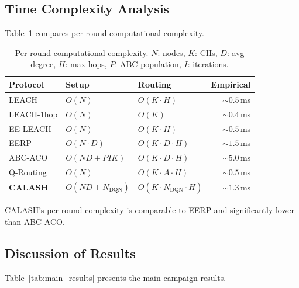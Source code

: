 \documentclass[12pt, onecolumn, journal]{IEEEtran}
\begin{document}
\subsection{Time Complexity Analysis}
\label{sec:complexity}

Table~\ref{tab:complexity} compares per-round computational complexity.

\begin{table}[!t]
\centering
\caption{Per-round computational complexity. $N$: nodes, $K$: CHs, $D$: avg degree, $H$: max hops, $P$: ABC population, $I$: iterations.}
\label{tab:complexity}
\begin{tabular}{lllr}
\toprule
Protocol & Setup & Routing & Empirical \\
\midrule
LEACH~\cite{heinzelman2000leach}       & $O(N)$             & $O(K \cdot H)$       & ${\sim}0.5$\,ms \\
LEACH-1hop                              & $O(N)$             & $O(K)$               & ${\sim}0.4$\,ms \\
EE-LEACH~\cite{bakaraniya2013eeleach}  & $O(N)$             & $O(K \cdot H)$       & ${\sim}0.5$\,ms \\
EERP~\cite{biswas2018eerp}             & $O(N \cdot D)$     & $O(K \cdot D \cdot H)$ & ${\sim}1.5$\,ms \\
ABC-ACO~\cite{elkhediri2024abcaco}     & $O(N\!D + PIK)$   & $O(K \cdot D \cdot H)$ & ${\sim}5.0$\,ms \\
Q-Routing~\cite{boyan1994qrouting}   & $O(N)$             & $O(K \cdot A \cdot H)$ & ${\sim}0.5$\,ms \\
\textbf{CALASH}                         & $O(N\!D + N_{\text{DQN}})$ & $O(K \cdot N_{\text{DQN}} \cdot H)$ & ${\sim}1.3$\,ms \\
\bottomrule
\end{tabular}
\end{table}

CALASH's per-round complexity is comparable to EERP and significantly lower than ABC-ACO.

\subsection{Discussion of Results}
\label{sec:discussion}

Table~\ref{tab:main_results} presents the main campaign results.
\end{document}
